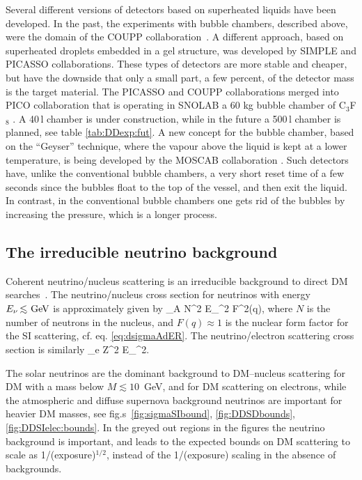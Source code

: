Several different versions of detectors based on superheated liquids have been developed. In the past, the experiments with bubble chambers, described above, were the domain of the COUPP collaboration~\cite{1204.3094}.  
A different approach, based on superheated droplets embedded in a gel structure, was developed by SIMPLE \cite{1404.4309} and PICASSO  \cite{1611.01499} collaborations. These types of detectors are more stable and cheaper, but have the downside that only a small part, a few percent, of the detector mass is the target material. The PICASSO and COUPP collaborations merged into PICO collaboration that is operating in SNOLAB a 60 kg bubble chamber of C${}_3$F${}_8$ \cite{1510.07754,1702.07666}. A 40\,l chamber is under construction, while  in the future a 500\,l chamber is planned, see table \ref{tab:DDexp:fut}.  A new concept for the bubble chamber, based on the ``Geyser'' technique, where the vapour above the liquid is kept at a lower temperature, is being developed by the MOSCAB collaboration \cite{1708.00101}. Such detectors have, unlike the conventional bubble chambers, a very short reset time of a few seconds since the bubbles float to the top of the vessel, and then exit the liquid. In contrast, in the conventional bubble chambers one gets rid of the bubbles by increasing the pressure, which is a longer process. 


\subsection{The irreducible neutrino background}
\label{nubck}

Coherent neutrino/nucleus scattering is an irreducible background to direct DM searches~\cite{nubckg}.
The neutrino/nucleus cross section for neutrinos with energy $E_\nu \circa{<}\GeV$  
is approximately given by
\beq 
\sigma_{\nu A} \approx {}N^2 E_\nu^2 F^2(q),
\eeq
where $N$ is the number of neutrons in the nucleus, and $F(q)\approx 1$ is the nuclear form factor for the SI scattering, cf. eq. \eqref{eq:dsigmaAdER}. The neutrino/electron scattering cross section is similarly
\beq 
\sigma_{\nu e} \approx {}Z^2 E_\nu^2.
\eeq



The solar neutrinos are the dominant background to DM--nucleus scattering for  DM with a mass below $M\lesssim 10$~GeV,  and for DM scattering on electrons, while the atmospheric and  diffuse supernova background neutrinos are important for heavier DM masses, see fig.s~\ref{fig:sigmaSIbound}, \ref{fig:DDSDbounds}, \ref{fig:DDSIelec:bounds}. In the greyed out regions in the figures the neutrino background is important, and leads to the expected bounds on DM scattering to scale  as 1/(exposure)${}^{1/2}$, instead of the  1/(exposure) scaling in the absence of backgrounds.


